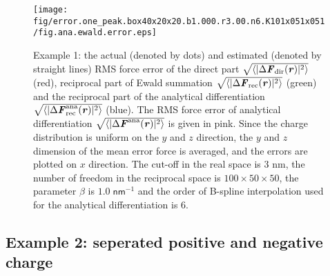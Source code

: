 \documentclass[aps,pre,preprint]{revtex4-1}
\renewcommand{\v}[1]{\textbf{\textit{#1}}}
\begin{document}
\begin{figure}
  \centering
  \texttt{[image: fig/error.one\_peak.box40x20x20.b1.000.r3.00.n6.K101x051x051/fig.ana.ewald.error.eps]}
  \caption{Example 1: the actual (denoted by dots) and estimated
    (denoted by straight lines) RMS force error of the direct part
    $\sqrt{\langle\vert\Delta \v F_{\textrm{dir}}(\v
      r)\vert^2\rangle}$ (red), reciprocal part of Ewald summation
    $\sqrt{\langle\vert\Delta \v F_{\textrm{rec}}(\v
      r)\vert^2\rangle}$ (green) and the reciprocal part of the
    analytical differentiation $\sqrt{\langle\vert\Delta \v
      F^{\textrm{ana}}_{\textrm{rec}}(\v r)\vert^2\rangle}$
    (blue). The RMS force error of analytical differentiation
    $\sqrt{\langle\vert\Delta \v F^{\textrm{ana}}(\v
      r)\vert^2\rangle}$ is given in pink.  Since the charge
    distribution is uniform on the $y$ and $z$ direction, the $y$ and
    $z$ dimension of the mean error force is averaged, and the errors
    are plotted on $x$ direction.  The cut-off in the real space is 3
    \textsf{nm}, the number of freedom in the reciprocal space is
    $100\times 50\times 50$, the parameter $\beta$ is $1.0\;
    \textsf{nm}^{-1}$ and the order of B-spline interpolation used for
    the analytical differentiation is 6.}
  \label{fig:error1}
\end{figure}



\subsection{Example 2: seperated positive and negative charge}
\end{document}
